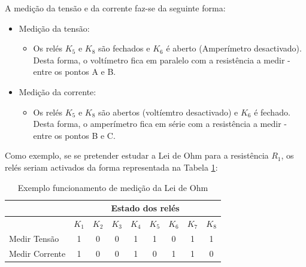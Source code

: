 A medição da tensão e da corrente faz-se da seguinte forma:
\begin{itemize}
	\item Medição da tensão:
	      \begin{itemize}
		      \item Os relés $K_{5}$ e $K_{8}$ são fechados e $K_{6}$ é aberto (Amperímetro desactivado). Desta forma, o voltímetro fica em paralelo com a resistência a medir - entre os pontos A e B.
	      \end{itemize}
	\item Medição da corrente:
	      \begin{itemize}
		      \item Os relés $K_{5}$ e $K_{8}$ são abertos (voltíemtro desactivado) e $K_{6}$ é fechado. Desta forma, o amperímetro fica em série com a resistência a medir - entre os pontos B e C.
	      \end{itemize}
\end{itemize}


Como exemplo, se se pretender estudar a Lei de Ohm para a resistência $R_{1}$, os relés seriam activados da forma representada na Tabela \ref{Table:exemplomedicaoohm}:

\begin{table}[htb]
	\centering
	\caption{Exemplo funcionamento de medição da Lei de Ohm} 
	
	\label{Table:exemplomedicaoohm}
	\begin{tabular}{lcccccccc}
		\toprule
		               & \multicolumn{8}{c}{Estado dos relés}                                                                       \\
		\midrule
		               & $K_{1}$                              & $K_{2}$ & $K_{3}$ & $K_{4}$ & $K_{5}$ & $K_{6}$ & $K_{7}$ & $K_{8}$ \\
		\midrule
		Medir Tensão   & 1                                    & 0       & 0       & 1       & 1       & 0       & 1       & 1       \\
		\midrule
		Medir Corrente & 1                                    & 0       & 0       & 1       & 0       & 1       & 1       & 0       \\
		\bottomrule
	\end{tabular}
\end{table}

